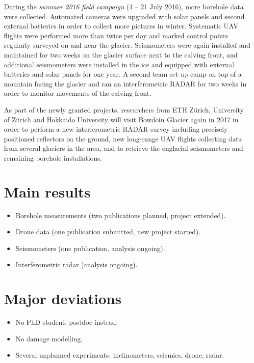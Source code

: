 \documentclass{article}
\begin{document}
During the \emph{summer 2016 field campaign} (4 -- 21 July 2016), more borehole
data were collected. Automated cameras were upgraded with solar panels and
second external batteries in order to collect more pictures in winter.
Systematic UAV flights were performed more than twice per day and marked
control points regularly surveyed on and near the glacier. Seismometers were
again installed and maintained for two weeks on the glacier surface next to the
calving front, and additional seismometers were installed in the ice and
equipped with external batteries and solar panels for one year. A second team
set up camp on top of a mountain facing the glacier and ran an interferometric
RADAR for two weeks in order to monitor movements of the calving front.

As part of the newly granted projects, researchers from ETH Zürich, University
of Zürich and Hokkaido University will visit Bowdoin Glacier again in 2017 in
order to perform a new interferometric RADAR survey including precisely
positioned reflectors on the ground, new long-range UAV flights collecting data
from several glaciers in the area, and to retrieve the englacial seismometers
and remaining borehole installations.


\section{Main results}

\begin{itemize}
\item Borehole measurements (two publications planned, project extended).
\item Drone data (one publication submitted, new project started).
\item Seismometers (one publication, analysis ongoing).
\item Interferometric radar (analysis ongoing).
\end{itemize}

\section{Major deviations}

\begin{itemize}
\item No PhD-student, postdoc instead.
\item No damage modelling.
\item Several unplanned experiments: inclinometers, seismics, drone, radar.
\end{itemize}
\end{document}
